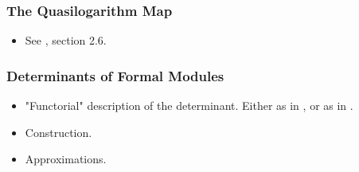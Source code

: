 
\subsubsection{The Quasilogarithm Map} %
\label{ssub:The Quasilogarithm map}
\begin{itemize}
  \item See \cite{BoyarchenkoWeinstein2011MaxVar}, section 2.6.
\end{itemize}

\subsubsection{Determinants of Formal Modules} %
\label{ssub:Determinants of Formal Modules}
\begin{itemize}
  \item "Functorial" description of the determinant. Either as in
    \cite{BoyarchenkoWeinstein2011MaxVar}, or as in \cite{weinstein2016semistable}.
  \item Construction.
  \item Approximations.
\end{itemize}

